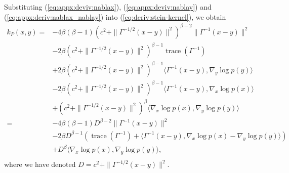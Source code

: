 \documentclass[12pt,a4paper]{report}
\DeclareMathOperator{\trace}{trace}
\begin{document}
Substituting (\ref{eq:appx:deviv:nablax}), (\ref{eq:appx:deviv:nablay}) and (\ref{eq:appx:deriv:nablax_nablay}) into (\ref{eq:deriv:stein-kernel}), we obtain
\begin{equation}
\begin{aligned}
k_P(x, y)
= &-4 \beta(\beta-1) \left(c^2 + \| \Gamma^{-1/2}(x-y)\|^2\right)^{\beta-2} \| \Gamma^{-1}(x - y)\|^2 \\
&- 2\beta \left(c^2 + \|\Gamma^{-1/2}(x-y)\|^2\right)^{\beta-1} \trace(\Gamma^{-1}) \\
&+ 2 \beta \left(c^2 + \| \Gamma^{-1/2} (x-y)\|^2\right)^{\beta-1} \langle \Gamma^{-1} (x - y), \nabla_y \log p(y)\rangle \\
&- 2 \beta \left(c^2 + \| \Gamma^{-1/2} (x-y)\|^2\right)^{\beta-1} \langle \Gamma^{-1} (x - y), \nabla_x \log p(x)\rangle \\
&+ \left(c^2 + \| \Gamma^{-1/2} (x-y)\|^2\right)^\beta \langle \nabla_x \log p(x), \nabla_y \log p(y) \rangle \\
= &-4 \beta(\beta-1) D^{\beta-2} \| \Gamma^{-1}(x - y)\|^2  \\
&- 2 \beta D^{\beta-1} (\trace(\Gamma^{-1}) + \langle \Gamma^{-1} (x - y), \nabla_x \log p(x) - \nabla_y \log p(y)\rangle) \\
&+ D^\beta \langle \nabla_x \log p(x), \nabla_y \log p(y) \rangle, \\
\end{aligned}
\end{equation}
where we have denoted $D = c^2 + \| \Gamma^{-1/2}(x-y)\|^2$.




\end{document}
